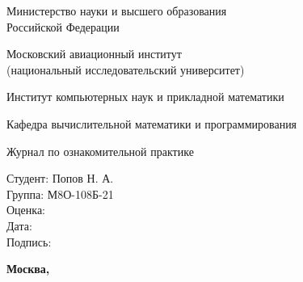 \documentclass[12pt]{article}
\begin{document}
\begin{titlepage}
\begin{center}
\bfseries

{\Large Министерство науки и высшего образования \\ Российской Федерации}

\vspace{12pt}

{\Large Московский авиационный институт \\ (национальный исследовательский университет)}

\vspace{48pt}

\large Институт компьютерных наук и прикладной математики

\vspace{36pt}

\large Кафедра вычислительной математики и программирования

\vspace{72pt}

Журнал по ознакомительной практике \\

\end{center}

\vspace{150pt}

\begin{flushleft}
\hspace{350pt} Студент: Попов Н. А. \\
\hspace{350pt} Группа: М8О-108Б-21 \\
\vspace{5pt}
\hspace{350pt} Оценка: \\
\vspace{5pt}
\hspace{350pt} Дата: \\
\vspace{5pt}
\hspace{350pt} Подпись:
\end{flushleft}

\vspace*{\fill}

\begin{center}
\bfseries
Москва, \the\year
\end{center}
\end{titlepage}

\pagebreak








\pagebreak
\end{document}
